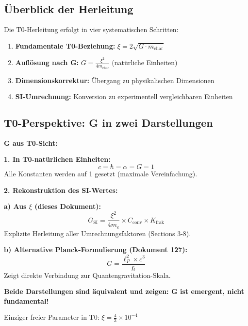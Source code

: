 	\subsection{Überblick der Herleitung}
	
	Die T0-Herleitung erfolgt in vier systematischen Schritten:
	
	\begin{enumerate}
		\item \textbf{Fundamentale T0-Beziehung:} $\xi = 2\sqrt{G \cdot m_{\text{char}}}$
		\item \textbf{Auflösung nach G:} $G = \frac{\xi^2}{4m_{\text{char}}}$ (natürliche Einheiten)
		\item \textbf{Dimensionskorrektur:} Übergang zu physikalischen Dimensionen
		\item \textbf{SI-Umrechnung:} Konversion zu experimentell vergleichbaren Einheiten
	\end{enumerate}
	
	\subsection{T0-Perspektive: G in zwei Darstellungen}
	
	\begin{keyresult}
		\textbf{G aus T0-Sicht:}
		
		\textbf{1. In T0-natürlichen Einheiten:}
		\begin{equation}
			c = \hbar = \alpha = G = 1
		\end{equation}
		Alle Konstanten werden auf 1 gesetzt (maximale Vereinfachung).
		
		\textbf{2. Rekonstruktion des SI-Wertes:}
		
		\textbf{a) Aus $\xi$ (dieses Dokument):}
		\begin{equation}
			G_{\text{SI}} = \frac{\xi^2}{4m_e} \times C_{\text{conv}} \times K_{\text{frak}}
		\end{equation}
		Explizite Herleitung aller Umrechnungsfaktoren (Sections 3-8).
		
		\textbf{b) Alternative Planck-Formulierung (Dokument 127):}
		\begin{equation}
			G = \frac{\ell_P^2 \times c^3}{\hbar}
		\end{equation}
		Zeigt direkte Verbindung zur Quantengravitation-Skala.
		
		\textbf{Beide Darstellungen sind äquivalent und zeigen: G ist emergent, nicht fundamental!}
		
		Einziger freier Parameter in T0: $\xi = \frac{4}{3} \times 10^{-4}$
	\end{keyresult}
	
